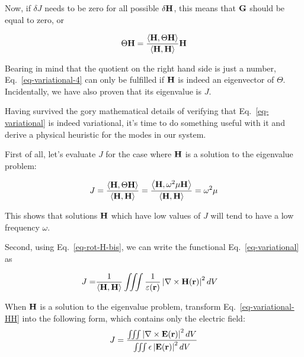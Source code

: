 Now, if $\delta J$ needs to be zero for all possible ${\delta \bf H}$, this means that ${\bf G}$ should be equal to zero, or

\begin{equation}
\Theta {\bf H} = \frac{\left\langle {\bf H} , \Theta {\bf H}\right\rangle}{\left\langle {\bf H} , {\bf H}\right\rangle} {\bf H} \label{eq-variational-4}
\end{equation} 

Bearing in mind that the quotient on the right hand side is just a number, Eq.~\ref{eq-variational-4} can only be fulfilled if ${\bf H}$ is indeed an eigenvector of $\Theta$. Incidentally, we have also proven that its eigenvalue is $J$.

Having survived the gory mathematical details of verifying that Eq.~\ref{eq-variational} is indeed variational, it's time to do something useful with it and derive a physical heuristic for the modes in our system.

First of all, let's evaluate $J$ for the case where ${\bf H}$ is a solution to the eigenvalue problem:

\begin{equation}
J =  \frac{\left\langle {\bf H} , \Theta {\bf H}\right\rangle}{\left\langle {\bf H} , {\bf H}\right\rangle} = \frac{\left\langle {\bf H} , \omega^2 \mu {\bf H}\right\rangle}{\left\langle {\bf H} , {\bf H}\right\rangle} = \omega^2 \mu
\end{equation}

This shows that solutions ${\bf H}$ which have low values of $J$ will tend to have a low frequency $\omega$.

Second, using Eq.~\ref{eq-rot-H-bis}, we can write the functional Eq.~\ref {eq-variational} as

\begin{align}
J =& \frac{1}{\left\langle {\bf H} , {\bf H}\right\rangle}  \iiint \frac{1}{\varepsilon({\bf r})} \left | \nabla \times {\bf H({\bf r})} \right |^2  dV  \label{eq-variational-HH}
\end{align} 

\begin{sidebar}
\begin{ex}
When ${\bf H}$ is a solution to the eigenvalue problem, transform Eq.~\ref{eq-variational-HH} into the following form, which contains only the electric field:
$$J=\frac{\iiint \left | \nabla \times {\bf E({\bf r})} \right |^2  dV} {\iiint \epsilon \left | {\bf E({\bf r})} \right |^2  dV} $$
\end{ex}
\end{sidebar}

